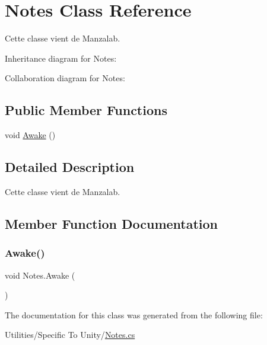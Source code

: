 \hypertarget{class_notes}{}\section{Notes Class Reference}
\label{class_notes}


Cette classe vient de Manzalab.  




Inheritance diagram for Notes\+:


Collaboration diagram for Notes\+:
\subsection*{Public Member Functions}
\begin{DoxyCompactItemize}
\item 
void \hyperlink{class_notes_a05a78e5e9d66b35929a106ffd3aa8de5}{Awake} ()
\end{DoxyCompactItemize}


\subsection{Detailed Description}
Cette classe vient de Manzalab. 



\subsection{Member Function Documentation}
\mbox{\label{class_notes_a05a78e5e9d66b35929a106ffd3aa8de5}} 
\subsubsection{\texorpdfstring{Awake()}{Awake()}}
{\footnotesize\ttfamily void Notes.\+Awake (\begin{DoxyParamCaption}{ }\end{DoxyParamCaption})\hspace{0.3cm}{\ttfamily [inline]}}



The documentation for this class was generated from the following file\+:\begin{DoxyCompactItemize}
\item 
Utilities/\+Specific To Unity/\hyperlink{_notes_8cs}{Notes.\+cs}\end{DoxyCompactItemize}
